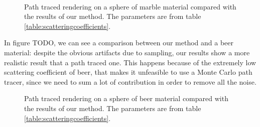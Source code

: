 \begin{figure}
{}
\\
\label{fig:pathmarble}
\caption{Path traced rendering on a sphere of marble material compared with the results of our method. The parameters are from table \ref{table:scatteringcoefficients}.}
\end{figure}

\FloatBarrier
In figure TODO, we can see a comparison between our method and a beer material: despite the obvious artifacts due to sampling, our results show a more realistic result that a path traced one. This happens because of the extremely low scattering coefficient of beer, that makes it unfeasible to use a Monte Carlo path tracer, since we need to sum a lot of contribution in order to remove all the noise. 

\begin{figure}[!ht]
\centering
{}
\label{fig:pathbeer}
\caption{Path traced rendering on a sphere of beer material compared with the results of our method. The parameters are from table \ref{table:scatteringcoefficients}.}
\end{figure}

